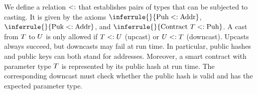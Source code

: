 \documentclass[a4paper]{llncs}
\begin{document}


We define a relation $<:$ that establishes pairs of types that can be
subjected to casting. It is given by the axioms
$\inferrule{}{\TPUH \SubType \TADDR}$, $\inferrule{}{\TPUK \SubType
  \TADDR}$, and $\inferrule{}{\TCONTRACT\ \TYPE \SubType \TPUH}$.
A cast from $T$ to $U$ is only allowed
if $T <: U$ (upcast) or $U <: T$
(downcast). Upcasts always succeed, but downcasts may fail at run time.
In particular,  public hashes and public keys can both stand for addresses. Moreover, a smart
contract with parameter type $T$ is represented by its public hash
at run time. The corresponding downcast must check whether the public
hash is valid and has the expected parameter type.
\end{document}
